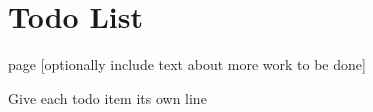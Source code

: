 \chapter{Todo List}
\hypertarget{todo}{}\label{todo}

\begin{DoxyRefList}
\item[page \doxylink{index}{Shapes Project } ]\label{todo__todo000001}%
%
\mbox{[}optionally include text about more work to be done\mbox{]} 



Give each todo item its own line
\end{DoxyRefList}